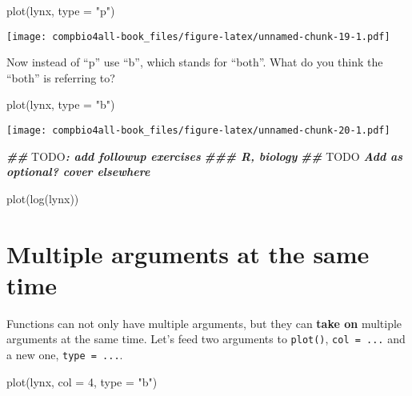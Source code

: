 \documentclass[
]{book}
\newenvironment{Shaded}{\begin{snugshade}}{\end{snugshade}}
\newcommand{\AlertTok}[1]{\textcolor[rgb]{0.94,0.16,0.16}{#1}}
\newcommand{\AttributeTok}[1]{\textcolor[rgb]{0.77,0.63,0.00}{#1}}
\newcommand{\DecValTok}[1]{\textcolor[rgb]{0.00,0.00,0.81}{#1}}
\newcommand{\DocumentationTok}[1]{\textcolor[rgb]{0.56,0.35,0.01}{\textbf{\textit{#1}}}}
\newcommand{\FunctionTok}[1]{\textcolor[rgb]{0.00,0.00,0.00}{#1}}
\newcommand{\NormalTok}[1]{#1}
\newcommand{\StringTok}[1]{\textcolor[rgb]{0.31,0.60,0.02}{#1}}
\begin{document}
\begin{Shaded}
\begin{Highlighting}[]
\FunctionTok{plot}\NormalTok{(lynx, }\AttributeTok{type =} \StringTok{"p"}\NormalTok{)}
\end{Highlighting}
\end{Shaded}

\texttt{[image: compbio4all-book\_files/figure-latex/unnamed-chunk-19-1.pdf]}

Now instead of ``p'' use ``b'', which stands for ``both''. What do you think the ``both'' is referring to?

\begin{Shaded}
\begin{Highlighting}[]
\FunctionTok{plot}\NormalTok{(lynx, }\AttributeTok{type =} \StringTok{"b"}\NormalTok{)}
\end{Highlighting}
\end{Shaded}

\texttt{[image: compbio4all-book\_files/figure-latex/unnamed-chunk-20-1.pdf]}

\begin{Shaded}
\begin{Highlighting}[]
\DocumentationTok{\#\# }\AlertTok{TODO}\DocumentationTok{: add followup exercises}
\DocumentationTok{\#\#\# R, biology}
\DocumentationTok{\#\# }\AlertTok{TODO}\DocumentationTok{ Add as optional? cover elsewhere}

\FunctionTok{plot}\NormalTok{(}\FunctionTok{log}\NormalTok{(lynx))}
\end{Highlighting}
\end{Shaded}

\hypertarget{multiple-arguments-at-the-same-time}{%
\section{Multiple arguments at the same time}\label{multiple-arguments-at-the-same-time}}

Functions can not only have multiple arguments, but they can \textbf{take on} multiple arguments at the same time. Let's feed two arguments to \texttt{plot()}, \texttt{col\ =\ ...} and a new one, \texttt{type\ =\ ...}.

\begin{Shaded}
\begin{Highlighting}[]
\FunctionTok{plot}\NormalTok{(lynx, }\AttributeTok{col =} \DecValTok{4}\NormalTok{, }\AttributeTok{type =} \StringTok{"b"}\NormalTok{)}
\end{Highlighting}
\end{Shaded}
\end{document}
